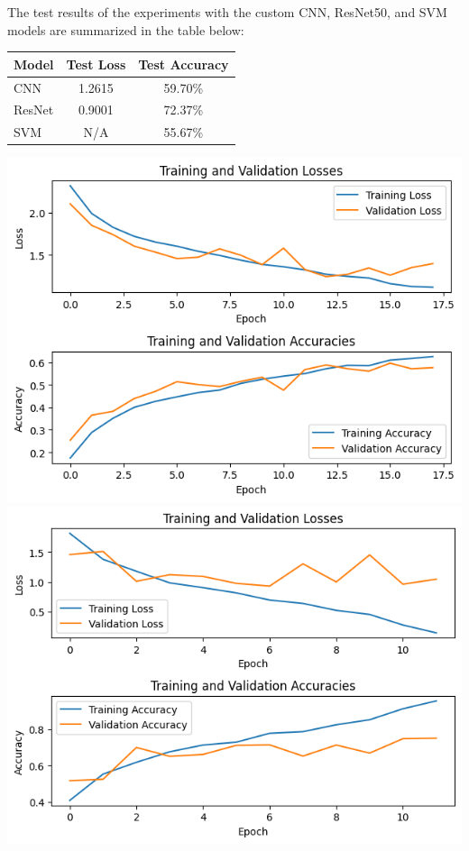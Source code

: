 \documentclass[a0,portrait]{a0poster}
\begin{document}
\begin{multicols}{2}
The test results of the experiments with the custom CNN, ResNet50, and SVM models are summarized in the table below:

\begin{center}
\begin{tabular}{l c c}
\toprule
\textbf{Model} & \textbf{Test Loss} & \textbf{Test Accuracy} \\
\midrule
CNN & 1.2615 & 59.70\% \\
ResNet & 0.9001 & 72.37\% \\
SVM & N/A & 55.67\% \\ 
\bottomrule
\end{tabular}
\end{center}

\begin{center}\vspace{1cm}
\includegraphics[width=0.6\linewidth]{figures/cnn_output.png}
\includegraphics[width=0.6\linewidth]{figures/resnet_output.png}
\end{center}\vspace{1cm}


\end{multicols}
\end{document}
